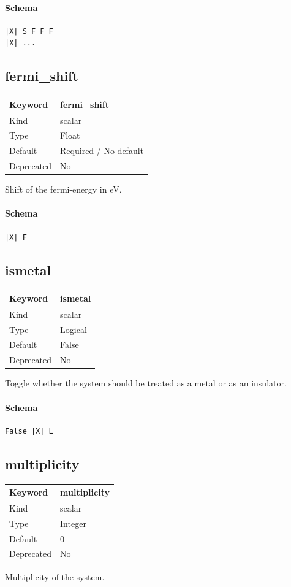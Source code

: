 \documentclass[11pt]{article}
\begin{document}
\paragraph{Schema}
\begin{Verbatim}
|X| S F F F
|X| ...
\end{Verbatim}

\subsection{fermi\_shift}
\label{kw:fermi-shift}
\begin{longtable}{|p{1.5in}|p{4.5in}|}
\hline
Keyword & fermi\_shift \\
\hline
Kind & scalar \\
\hline
Type & Float \\
\hline
Default & Required / No default \\
\hline
Deprecated & No \\
\hline
\end{longtable}
 Shift of the fermi-energy in eV.

\paragraph{Schema}
\begin{Verbatim}
|X| F
\end{Verbatim}

\subsection{ismetal}
\label{kw:ismetal}
\begin{longtable}{|p{1.5in}|p{4.5in}|}
\hline
Keyword & ismetal \\
\hline
Kind & scalar \\
\hline
Type & Logical \\
\hline
Default & False \\
\hline
Deprecated & No \\
\hline
\end{longtable}
 Toggle whether the system should be treated as a metal or as an insulator.

\paragraph{Schema}
\begin{Verbatim}
False |X| L
\end{Verbatim}

\subsection{multiplicity}
\label{kw:multiplicity}
\begin{longtable}{|p{1.5in}|p{4.5in}|}
\hline
Keyword & multiplicity \\
\hline
Kind & scalar \\
\hline
Type & Integer \\
\hline
Default & 0 \\
\hline
Deprecated & No \\
\hline
\end{longtable}
 Multiplicity of the system.
\end{document}
